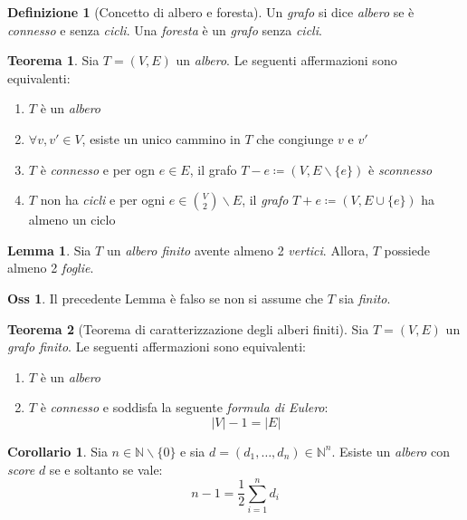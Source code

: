 \documentclass[12pt, a4paper]{report}
\newcommand{\N}{\mathbb{N}}
\theoremstyle{definition}
\newtheorem{definition}{Definizione}[section]
\newtheorem{theorem}{Teorema}[section]
\newtheorem{corollary}{Corollario}[section]
\newtheorem{lemma}{Lemma}[section]
\newtheorem{observation}{Oss}[section]
\begin{document}
\begin{definition}[Concetto di albero e foresta]
    Un \emph{grafo} si dice \emph{albero} se è \emph{connesso} e senza \emph{cicli}.
    Una \emph{foresta} è un \emph{grafo} senza \emph{cicli}.
\end{definition}

\begin{theorem}
    Sia $T=(V,E)$ un \emph{albero}. Le seguenti affermazioni sono equivalenti:
    \begin{enumerate}[label=(\roman*)]
        \item $T$ è un \emph{albero}
        \item $\forall v,v'\in V$, esiste un unico cammino in $T$ che congiunge
        $v$ e $v'$
        \item $T$ è \emph{connesso} e per ogn $e\in E$, il grafo $T-e\coloneqq(V,
        E\backslash\{e\})$ è \emph{sconnesso}
        \item $T$ non ha \emph{cicli} e per ogni $e\in\binom{V}{2}\backslash E$, il
        \emph{grafo} $T+e\coloneqq(V,E\cup\{e\})$ ha almeno un ciclo
    \end{enumerate}
\end{theorem}

\begin{lemma}
    Sia $T$ un \emph{albero finito} avente almeno 2 \emph{vertici}. Allora, $T$
    possiede almeno 2 \emph{foglie}.
\end{lemma}
\begin{observation}
    Il precedente Lemma è falso se non si assume che $T$ sia \emph{finito}.
\end{observation}

\begin{theorem}[Teorema di caratterizzazione degli alberi finiti]
    Sia $T=(V,E)$ un \emph{grafo finito}. Le seguenti affermazioni sono equivalenti:
    \begin{enumerate}[label=(\roman*)]
        \item $T$ è un \emph{albero}
        \item $T$ è \emph{connesso} e soddisfa la seguente \emph{formula di Eulero}:
        \[|V|-1=|E|\]
    \end{enumerate}
\end{theorem}
\begin{corollary}
    Sia $n\in\N\backslash\{0\}$ e sia $d=(d_1,\dots,d_n)\in\N^n$. Esiste un
    \emph{albero} con \emph{score} $d$ se e soltanto se vale:
    \[n-1=\frac{1}{2}\sum_{i=1}^nd_i\]
\end{corollary}
\end{document}
